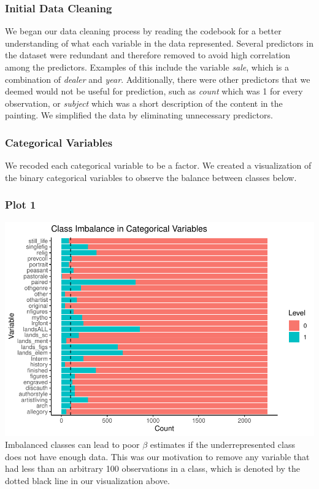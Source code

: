 \documentclass[]{article}
\begin{document}
\hypertarget{initial-data-cleaning}{%
\subsubsection{Initial Data Cleaning}\label{initial-data-cleaning}}

We began our data cleaning process by reading the codebook for a better
understanding of what each variable in the data represented. Several
predictors in the dataset were redundant and therefore removed to avoid
high correlation among the predictors. Examples of this include the
variable \emph{sale}, which is a combination of \emph{dealer} and
\emph{year}. Additionally, there were other predictors that we deemed
would not be useful for prediction, such as \emph{count} which was 1 for
every observation, or \emph{subject} which was a short description of
the content in the painting. We simplified the data by eliminating
unnecessary predictors.

\hypertarget{categorical-variables}{%
\subsubsection{Categorical Variables}\label{categorical-variables}}

We recoded each categorical variable to be a factor. We created a
visualization of the binary categorical variables to observe the balance
between classes below.

\hypertarget{plot-1}{%
\subsubsection{Plot 1}\label{plot-1}}

\includegraphics{Part-I-Writeup_files/figure-latex/unnamed-chunk-1-1.pdf}
Imbalanced classes can lead to poor \(\beta\) estimates if the
underrepresented class does not have enough data. This was our
motivation to remove any variable that had less than an arbitrary 100
observations in a class, which is denoted by the dotted black line in
our visualization above.
\end{document}
